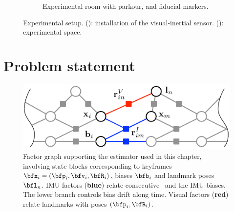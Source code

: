 \begin{figure}[h]
\begin{subfigure}{0.546\textwidth}
        \caption{Experimental room with parkour,  and fiducial markers.}
        \label{fig:bauzil}
    \end{subfigure}
    \caption{Experimental setup. (): installation of the visual-inertial sensor. (): experimental space.}
    \label{fig:HRP2}
\end{figure}



\section{Problem statement}

\begin{figure}
    \centering
    \includegraphics[scale=1.3]{figures/absolute/graph}
    \caption{Factor graph supporting the estimator used in this chapter, involving state blocks corresponding to keyframes $\bfx_i=(\bfp_i,\bfv_i,\bfR_i)$, biases $\bfb_i$ and landmark poses $\bfl_n$. 
    IMU factors (\textbf{blue}) relate consecutive \keyframes\ and the IMU biases.
    The lower branch controls bias drift along time.
    Visual factors (\textbf{red}) relate landmarks with poses $(\bfp_i,\bfR_i)$.}
    \label{fig:VI_factor_graph}
\end{figure}

